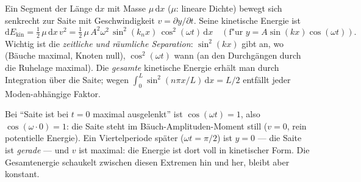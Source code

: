 \begin{werkzeugkasten}
Ein Segment der Länge $\mathrm{d}x$ mit Masse $\mu\,\mathrm{d}x$ ($\mu$:
lineare Dichte) bewegt sich senkrecht zur Saite mit Geschwindigkeit
$v=\partial y/\partial t$. Seine kinetische Energie ist
\begin{equation}
  \mathrm{d}E_{\text{kin}}=\tfrac12\,\mu\,\mathrm{d}x\,v^2
  =\tfrac12\,\mu\,A^2\omega^2\,\sin^2(k_nx)\,\cos^2(\omega t)\,\mathrm{d}x
  \quad(\text{f"ur } y=A\sin(kx)\cos(\omega t)).
\end{equation}
Wichtig ist die \emph{zeitliche und räumliche Separation}:
$\sin^2(kx)$ gibt an, wo (Bäuche maximal, Knoten null), $\cos^2(\omega t)$
wann (an den Durchgängen durch die Ruhelage maximal). Die \emph{gesamte}
kinetische Energie erhält man durch Integration über die Saite; wegen
$\int_0^L\sin^2(n\pi x/L)\,\mathrm{d}x=L/2$ entfällt jeder Moden-abhängige
Faktor.
\end{werkzeugkasten}

\begin{achtung}[Phase zum Zeitpunkt t = 0]%
Bei ``Saite ist bei $t=0$ maximal ausgelenkt'' ist $\cos(\omega t)=1$, also
$\cos(\omega\cdot0)=1$: die Saite steht im Bäuch-Amplituden-Moment still
($v=0$, rein potentielle Energie). Ein Viertelperiode später
($\omega t=\pi/2$) ist $y=0$ --- die Saite ist \emph{gerade} --- und $v$ ist
maximal: die Energie ist dort voll in kinetischer Form. Die Gesamtenergie
schaukelt zwischen diesen Extremen hin und her, bleibt aber konstant.
\end{achtung}
